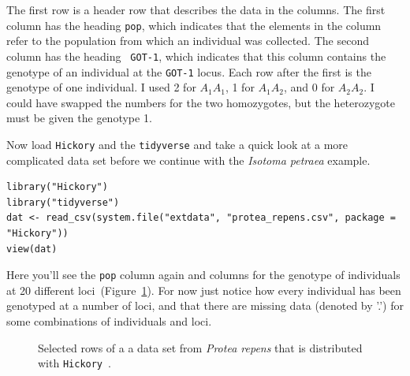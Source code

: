 The first row is a header row that describes the data in the
columns. The first column has the heading {\tt pop}, which indicates
that the elements in the column refer to the population from which an
individual was collected. The second column has the heading {\tt
  GOT-1}, which indicates that this column contains the genotype of an
individual at the {\tt GOT-1} locus. Each row after the first is the
genotype of one individual. I used 2 for $A_1A_1$, 1 for $A_1A_2$, and
0 for $A_2A_2$. I could have swapped the numbers for the two
homozygotes, but the heterozygote must be given the genotype 1.

Now load {\tt Hickory} and the {\tt tidyverse} and take a quick look
at a more complicated data set before we continue with the {\it
  Isotoma petraea\/} example.

\begin{verbatim}
library("Hickory")
library("tidyverse")
dat <- read_csv(system.file("extdata", "protea_repens.csv", package = "Hickory"))
view(dat)
\end{verbatim}

\noindent Here you'll see the {\tt pop} column again and columns for
the genotype of individuals at 20 different
loci~(Figure~\ref{fig:repens-csv}). For now just notice how
every individual has been genotyped at a number of loci, and that
there are missing data (denoted by '.') for some combinations of
individuals and loci.

\begin{figure}
  \begin{center}
  \end{center}
\caption{Selected rows of a a data set from {\it Protea repens\/} that
  is distributed with {\tt Hickory}~\cite{Prunier-etal-2017}.}\label{fig:repens-csv}
\end{figure}

